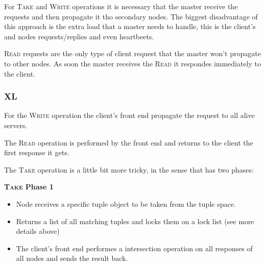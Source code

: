 \documentclass[times, 10pt,twocolumn]{article}
\begin{document}
For \textsc{Take} and \textsc{Write} operations it is necessary that the master receive the requests
and then propagate it tho secondary nodes. The biggest disadvantage of this approach is the extra
load that a master needs to handle, this is the client's and nodes requests/replies and even heartbeets.


\textsc{Read} requests are the only type of client request that the master won't propagate to other nodes.
As soon the master receives the \textsc{Read} it respondes immediately to the client.


\subsubsection{XL}


For the \textsc{Write} operation the client's front end propagate the request to all alive servers.

The \textsc{Read} operation is performed by the front end and returns to the client the first response it gets.

The \textsc{Take} operation is a little bit more tricky, in the sense that has two phases:

\textbf{\textsc{Take} Phase 1}
\begin{itemize}
   \item Node receives a specific tuple object to be taken from the tuple space.
   \item Returns a list of all matching tuples and locks them on a lock list (see more details above)
   \item The client's front end performes a intersection operation on all responses of all nodes and sends the result
   back.
\end{itemize}
\end{document}
